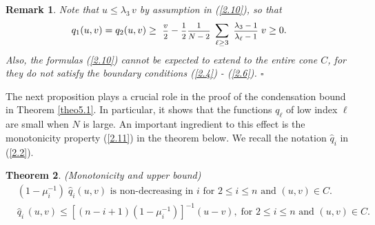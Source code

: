 \documentclass[12pt,leqno]{article}
\def\dis{\displaystyle}
\def\f{\footnotesize}
\def\wh{\widehat}
\newtheorem{theorem}{Theorem}[section]
\newtheorem{remark}[theorem]{Remark}
\begin{document}
\begin{remark}\label{rem2.10} \rm
Note that $u \le \lambda_3 \, v$ by assumption in (\ref{2.10}), so that
\begin{equation*}
q_1 (u,v) = q_2 (u,v) \ge \mbox{ \f $\dis\frac{v}{2}$} - \mbox{\f $\dis\frac{1}{2} \dis\frac{1}{N-2}$} \;  \dis\sum_{\ell \ge 3}\; \mbox{\f $\dis\frac{\lambda_3- 1}{\lambda_\ell - 1}$} \; v \ge 0.
\end{equation*}
Also, the formulas (\ref{2.10}) cannot be expected to extend to the entire cone $C$, for they do not satisfy the boundary conditions (\ref{2.4}) - (\ref{2.6}). \hfill $\square$
\end{remark}

The next proposition plays a crucial role in the proof of the condensation bound in Theorem \ref{theo5.1}. In particular, it shows that the functions $q_\ell$ of low index $\ell$ are small when $N$ is large. An important ingredient to this effect is the monotonicity property (\ref{2.11}) in the theorem below. We recall the notation $\wh{q}_i$ in (\ref{2.2}).

\begin{theorem}\label{theo2.3} {\it (Monotonicity and upper bound)}
\begin{align}
& \mbox{$(1 - \mu_i^{-1}) \; \wh{q}_i (u,v)$ is non-decreasing in $i$ for $2 \le i \le n$ and $(u,v) \in C$}. \label{2.11}
\\[1ex]
& \wh{q}_i \, (u,v) \le [(n - i + 1) (1 - \mu_i^{-1})]^{-1} (u-v), \;\mbox{for $2 \le i \le n$ and $(u,v) \in C$}. \label{2.12}
\end{align}
\end{theorem}
\end{document}
